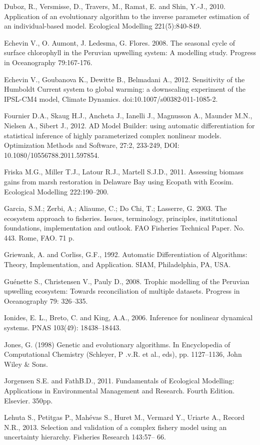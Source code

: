 Duboz, R., Versmisse, D., Travers, M., Ramat, E. and Shin, Y.-J., 2010. Application of an evolutionary algorithm to the inverse parameter estimation of an individual-based model. Ecological Modelling 221(5):840-849.

Echevin V., O. Aumont, J. Ledesma, G. Flores. 2008. The seasonal cycle of surface chlorophyll in the Peruvian upwelling system: A modelling study. Progress in Oceanography 79:167-176.

Echevin V., Goubanova K., Dewitte B., Belmadani A., 2012. Sensitivity of the Humboldt Current system to global warming: a downscaling experiment of the IPSL-CM4 model, Climate Dynamics. doi:10.1007/s00382-011-1085-2.

Fournier D.A., Skaug H.J., Ancheta J., Ianelli J., Magnusson A., Maunder M.N., Nielsen A., Sibert J., 2012. AD Model Builder: using automatic differentiation for statistical inference of highly parameterized complex nonlinear models. Optimization Methods and Software, 27:2, 233-249, DOI: 10.1080/10556788.2011.597854.

Friska M.G., Miller T.J., Latour R.J., Martell S.J.D., 2011. Assessing biomass gains from marsh restoration in Delaware Bay using Ecopath with Ecosim. Ecological Modelling 222:190–200.

Garcia, S.M.; Zerbi, A.; Aliaume, C.; Do Chi, T.; Lasserre, G. 2003. The ecosystem approach to fisheries. Issues, terminology, principles, institutional foundations, implementation and outlook. FAO Fisheries Technical Paper. No. 443. Rome, FAO. 71 p.

Griewank, A. and Corliss, G.F., 1992. Automatic Differentiation of Algorithms: Theory, Implementation, and Application. SIAM, Philadelphia, PA, USA.

Guénette S., Christensen V., Pauly D., 2008. Trophic modelling of the Peruvian upwelling ecosystem: Towards reconciliation of multiple datasets. Progress in Oceanography 79: 326–335.

Ionides, E. L., Breto, C. and King, A.A., 2006. Inference for nonlinear dynamical systems. PNAS 103(49): 18438–18443.

Jones, G. (1998) Genetic and evolutionary algorithms. In Encyclopedia of Computational Chemistry (Schleyer, P .v.R. et al., eds), pp. 1127–1136, John Wiley \& Sons.

Jorgensen S.E. and FathB.D., 2011. Fundamentals of Ecological Modelling: Applications in Environmental Management and Research. Fourth Edition. Elsevier. 350pp.

Lehuta S., Petitgas P., Mahévas S., Huret M., Vermard Y., Uriarte A.,  Record N.R.,  2013. Selection  and  validation  of  a  complex  fishery  model  using  an  uncertainty hierarchy. Fisheries  Research  143:57–  66.

